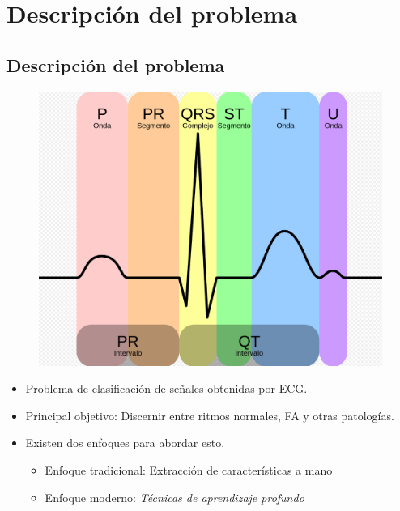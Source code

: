 \section{Descripción del problema}


\subsection{Descripción del problema}

\begin{frame}

    \begin{figure}
        \centering
        \includegraphics[scale=0.1]{Images/ECG_2.png}
    \end{figure}
    \begin{itemize}
        \pause
        \item Problema de clasificación de señales obtenidas por ECG.
        \pause
        \item Principal objetivo: Discernir entre ritmos normales, FA y otras patologías.
        \pause
        \item Existen dos enfoques para abordar esto.
        \pause
        \begin{itemize}
            \item Enfoque tradicional: Extracción de características a mano
            \item Enfoque moderno: {\color{TurkishRose} \textit{Técnicas de aprendizaje profundo}}
        \end{itemize}
    \end{itemize}
\end{frame}

